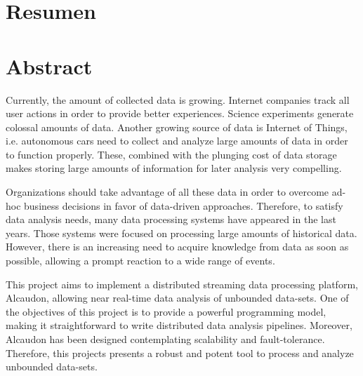 \chapter{Resumen}


\chapter{Abstract}

Currently, the amount of collected data is growing. Internet companies track all
user actions in order to provide better experiences. Science experiments
generate colossal amounts of data. Another growing source of data is Internet
of Things, i.e. autonomous cars need to collect and analyze large amounts of
data in order to function properly. These, combined with the plunging cost of
data storage makes storing large amounts of information for later analysis very
compelling.

Organizations should take advantage of all these data in order to overcome
ad-hoc business decisions in favor of data-driven approaches. Therefore, to
satisfy data analysis needs, many data processing systems have appeared in
the last years. Those systems were focused on processing large amounts of
historical data. However, there is an increasing need to acquire knowledge
from data as soon as possible, allowing a prompt reaction to a wide range of
events.

This project aims to implement a distributed streaming data processing platform,
Alcaudon, allowing near real-time data analysis of unbounded data-sets. One of
the objectives of this project is to provide a powerful programming model,
making it straightforward to write distributed data analysis pipelines.
Moreover, Alcaudon has been designed contemplating scalability and
fault-tolerance. Therefore, this projects presents a robust and potent tool to
process and analyze unbounded data-sets.
